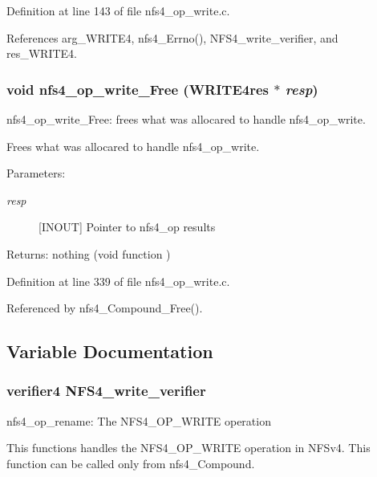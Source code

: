 Definition at line 143 of file nfs4\_\-op\_\-write.c.

References arg\_\-WRITE4, nfs4\_\-Errno(), NFS4\_\-write\_\-verifier, and res\_\-WRITE4.
\subsubsection{\setlength{\rightskip}{0pt plus 5cm}void nfs4\_\-op\_\-write\_\-Free (WRITE4res $\ast$ {\em resp})}\label{nfs4__op__write_8c_a4}


nfs4\_\-op\_\-write\_\-Free: frees what was allocared to handle nfs4\_\-op\_\-write.

Frees what was allocared to handle nfs4\_\-op\_\-write.

\begin{Desc}
\item[Parameters:]
\begin{description}
\item[{\em resp}][INOUT] Pointer to nfs4\_\-op results\end{description}
\end{Desc}
\begin{Desc}
\item[Returns:]nothing (void function ) \end{Desc}


Definition at line 339 of file nfs4\_\-op\_\-write.c.

Referenced by nfs4\_\-Compound\_\-Free().

\subsection{Variable Documentation}
\subsubsection{\setlength{\rightskip}{0pt plus 5cm}verifier4 {\bf NFS4\_\-write\_\-verifier}}\label{nfs4__op__write_8c_a2}


nfs4\_\-op\_\-rename: The NFS4\_\-OP\_\-WRITE operation

This functions handles the NFS4\_\-OP\_\-WRITE operation in NFSv4. This function can be called only from nfs4\_\-Compound.

